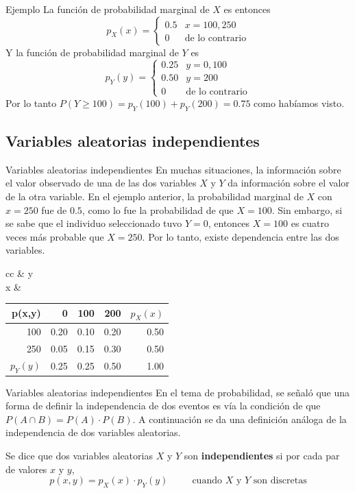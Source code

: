 \documentclass[11pt]{beamer}
\begin{document}
\begin{frame}{Ejemplo}
La función de probabilidad marginal de $X$ es entonces
$$ p_X(x)=\left\{  \begin{matrix} 0.5 & x=100, 250 \\ 0 & \mbox{de lo contrario} \end{matrix}  \right.$$
Y la función de probabilidad marginal de $Y$ es
$$ p_Y(y)=\left\{  \begin{matrix} 0.25 & y=0, 100 \\ 0.50 & y=200 \\ 0 & \mbox{de lo contrario} \end{matrix}  \right.$$
Por lo tanto $P(Y \ge100)=p_Y(100)+p_Y(200)=0.75$ como habíamos visto.
\end{frame}


\subsection{Variables aleatorias independientes}
\begin{frame}{Variables aleatorias independientes}
En muchas situaciones, la información sobre el valor observado de una de las dos variables $X$ y $Y$ da 
información sobre el valor de la otra variable. En el ejemplo anterior, la probabilidad marginal de $X$ 
con $x = 250$ fue de $0.5$, como lo fue la probabilidad de que $X = 100$. Sin embargo, si se sabe que el 
individuo seleccionado tuvo $Y = 0$, entonces $X = 100$ es cuatro veces más probable que $X = 250$. Por 
lo tanto, existe dependencia entre las dos variables.
\begin{center}
\begin{tabular}{cc}
& y \\
x &
\begin{tabular}{r|rrr|r}
p(x,y) & 0 &  100 & 200 & $p_X(x)$ \\
\hline 
100 & 0.20 & 0.10 & 0.20  & 0.50 \\
250 & 0.05 & 0.15 & 0.30 & 0.50 \\
\hline
$p_Y(y)$ & 0.25 & 0.25 & 0.50 & 1.00
\end{tabular}
\end{tabular}
\end{center}
\end{frame}
\begin{frame}{Variables aleatorias independientes}
En el tema de probabilidad, se señaló que una forma de definir la independencia de dos eventos
es vía la condición de que $P(A \cap B) = P(A) \cdot P(B)$. A continuación se da una definición
análoga de la independencia de dos variables aleatorias.

\bigskip
Se dice que dos variables aleatorias $X$ y $Y$ son {\bf independientes} si por cada par de valores $x$ y $y$,
$$p(x,y)=p_X(x)\cdot p_Y(y) \hspace{30pt} \mbox{cuando }X \mbox{ y }Y\mbox{ son discretas}$$
\end{frame}
\end{document}
